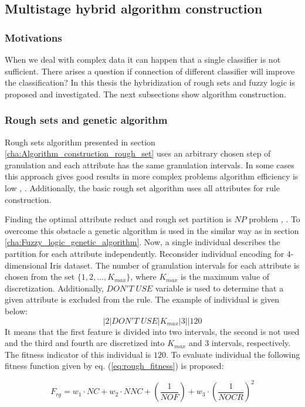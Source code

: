 \subsection{Multistage hybrid algorithm construction}
\label{cha:Multistage}
\subsubsection{Motivations}
\label{cha:Mutlistage_motivations}
When we deal with complex data it can happen that a single classifier is not
sufficient. There arises a question if connection of different classifier will
improve the classification? In this thesis the hybridization of rough sets and
fuzzy logic is proposed and investigated. The next subsections show algorithm construction.
\subsubsection{Rough sets and genetic algorithm}
\label{cha:Multistage_rough_genetic}
Rough sets algorithm presented in section \ref{cha:Algorithm_construction_rough_set} uses an 
arbitrary chosen step of granulation and each attribute has the same
granulation intervals. In some cases this approach gives good results in more
complex problems algorithm efficiency is low \cite{bib24}, \cite{bib29}. Additionally, the basic rough set
algorithm uses all attributes for rule construction.

Finding the optimal attribute reduct and rough set partition is $NP$ problem \cite{bib19}, \cite{bib1}.
To overcome this obstacle a genetic algorithm is used in the similar way as in section
\ref{cha:Fuzzy_logic_genetic_algorithm}. Now, a single individual describes the
partition for each attribute independently. Reconsider individual encoding for
$4$-dimensional Iris dataset. The number of granulation intervals for each attribute is
chosen from the set $\{1, 2, \ldots, K_{max}\}$, where $K_{max}$ is the maximum
value of discretization. Additionally, $DON'T\; USE$ variable is used to
determine that a given attribute is excluded from the rule. The example of
individual is given below:
$$|2|DON'T \; USE|K_{max}|3||120$$
It means that the first feature is divided into two intervals, the second is
not used and the third and fourth are discretized into $K_{max}$ and 3
intervals, respectively. The fitness indicator of this individual is $120$.
To evaluate individual the following fitness function given by eq.
(\ref{eq:rough_fitness}) is proposed:

\begin{equation}
    F_{rg} = w_1\cdot NC + w_2\cdot NNC + (\frac{1}{NOF}) +w_3\cdot (\frac{1}{NOCR})^2
    \label{eq:rough_fitness}
\end{equation}

